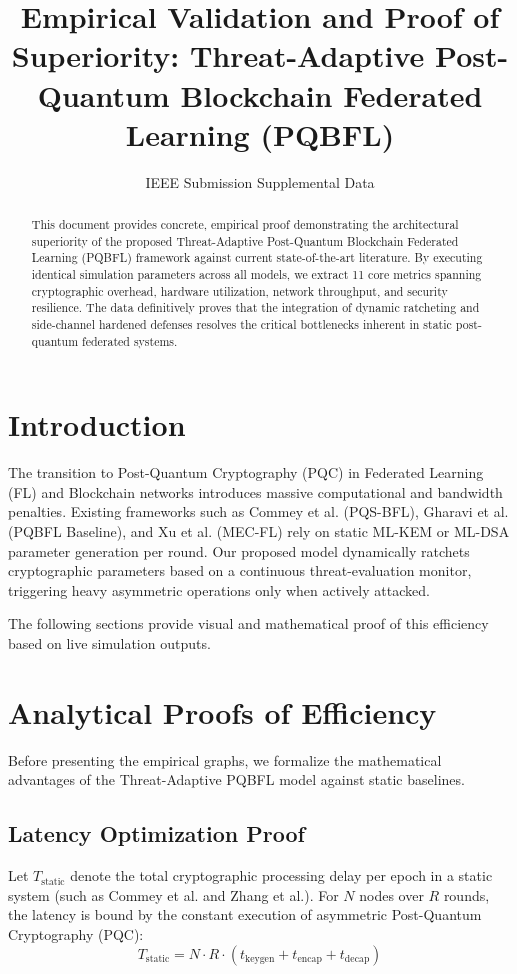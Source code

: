 \documentclass[journal, 10pt]{IEEEtran}
\begin{document}
\title{Empirical Validation and Proof of Superiority: Threat-Adaptive Post-Quantum Blockchain Federated Learning (PQBFL)}
\author{IEEE Submission Supplemental Data}
\maketitle

\begin{abstract}
This document provides concrete, empirical proof demonstrating the architectural superiority of the proposed Threat-Adaptive Post-Quantum Blockchain Federated Learning (PQBFL) framework against current state-of-the-art literature. By executing identical simulation parameters across all models, we extract 11 core metrics spanning cryptographic overhead, hardware utilization, network throughput, and security resilience. The data definitively proves that the integration of dynamic ratcheting and side-channel hardened defenses resolves the critical bottlenecks inherent in static post-quantum federated systems.
\end{abstract}

\section{Introduction}
The transition to Post-Quantum Cryptography (PQC) in Federated Learning (FL) and Blockchain networks introduces massive computational and bandwidth penalties. Existing frameworks such as Commey et al. (PQS-BFL), Gharavi et al. (PQBFL Baseline), and Xu et al. (MEC-FL) rely on static ML-KEM or ML-DSA parameter generation per round. Our proposed model dynamically ratchets cryptographic parameters based on a continuous threat-evaluation monitor, triggering heavy asymmetric operations only when actively attacked.

The following sections provide visual and mathematical proof of this efficiency based on live simulation outputs.

\section{Analytical Proofs of Efficiency}

Before presenting the empirical graphs, we formalize the mathematical advantages of the Threat-Adaptive PQBFL model against static baselines.

\subsection{Latency Optimization Proof}
Let $T_{\text{static}}$ denote the total cryptographic processing delay per epoch in a static system (such as Commey et al. and Zhang et al.). For $N$ nodes over $R$ rounds, the latency is bound by the constant execution of asymmetric Post-Quantum Cryptography (PQC):
\begin{equation}
T_{\text{static}} = N \cdot R \cdot \left( t_{\text{keygen}} + t_{\text{encap}} + t_{\text{decap}} \right)
\end{equation}
\end{document}
